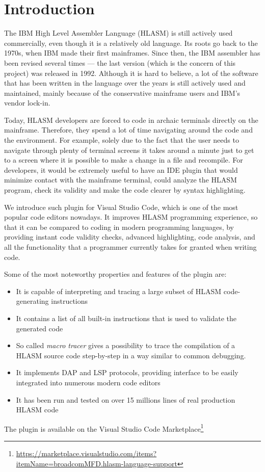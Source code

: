 \chapter{Introduction}

The IBM High Level Assembler Language (HLASM) is still actively used commercially, even though it is a relatively old language. Its roots go back to the 1970s, when IBM made their first mainframes. Since then, the IBM assembler has been revised several times --- the last version (which is the concern of this project) was released in 1992. Although it is hard to believe, a lot of the software that has been written in the language over the years is still actively used and maintained, mainly because of the conservative mainframe users and IBM's vendor lock-in.

Today, HLASM developers are forced to code in archaic terminals directly on the mainframe. Therefore, they spend a lot of time navigating around the code and the environment. For example, solely due to the fact that the user needs to navigate through plenty of terminal screens it takes around a minute just to get to a screen where it is possible to make a change in a file and recompile. For developers, it would be extremely useful to have an IDE plugin that would minimize contact with the mainframe terminal, could analyze the HLASM program, check its validity and make the code clearer by syntax highlighting. 

We introduce such plugin for Visual Studio Code, which is one of the most popular code editors nowadays. It improves HLASM programming experience, so that it can be compared to coding in modern programming languages, by providing instant code validity checks, advanced highlighting, code analysis, and all the functionality that a programmer currently takes for granted when writing code.

Some of the most noteworthy properties and features of the plugin are:
\begin{itemize}
	\item It is capable of interpreting and tracing a large subset of HLASM code-generating instructions
	\item It contains a list of all built-in instructions that is used to validate the generated code
	\item So called \emph{macro tracer} gives a possibility to trace the compilation of a HLASM source code step-by-step in a way similar to common debugging.
	\item It implements DAP and LSP protocols, providing interface to be easily integrated into numerous modern code editors
	\item It has been run and tested on over 15 millions lines of real production HLASM code
\end{itemize}
The plugin is available on the Visual Studio Code Marketplace\footnote{\url{https://marketplace.visualstudio.com/items?itemName=broadcomMFD.hlasm-language-support}}

